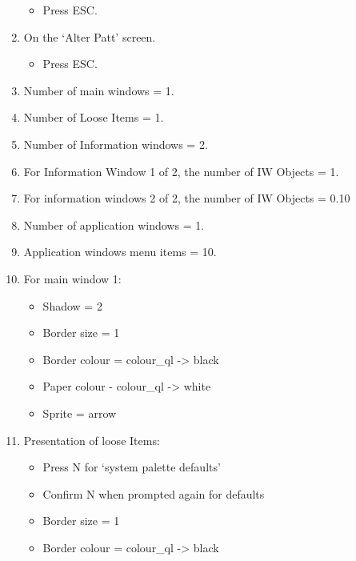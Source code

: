 \begin{enumerate}
{\begin{itemize}[itemsep=0pt]
\item{}Press ESC.

\end{itemize}
}
\item{On the `Alter Patt' screen.
\begin{itemize}[itemsep=0pt]

\item{}Press ESC.

\end{itemize}
}
\item{Number of main windows = 1.
}
\item{Number of Loose Items = 1.
}
\item{Number of Information windows = 2.
}
\item{For Information Window 1 of 2, the number of IW Objects =
        1.
}
\item{For information windows 2 of 2, the number of IW Objects =
        0.10
}
\item{Number of application windows = 1.
}
\item{Application windows menu items = 10.
}
\item{For main window 1:
\begin{itemize}[itemsep=0pt]

\item{}Shadow = 2


\item{}Border size = 1


\item{}Border colour = colour\_ql -{}>{} black


\item{}Paper colour -{} colour\_ql -{}>{} white


\item{}Sprite = arrow

\end{itemize}
}
\item{Presentation of loose Items:
\begin{itemize}[itemsep=0pt]

\item{}Press N for `system palette defaults'


\item{}Confirm N when prompted again for defaults


\item{}Border size = 1


\item{}Border colour = colour\_ql -{}>{} black



\end{itemize}}
\end{enumerate}
